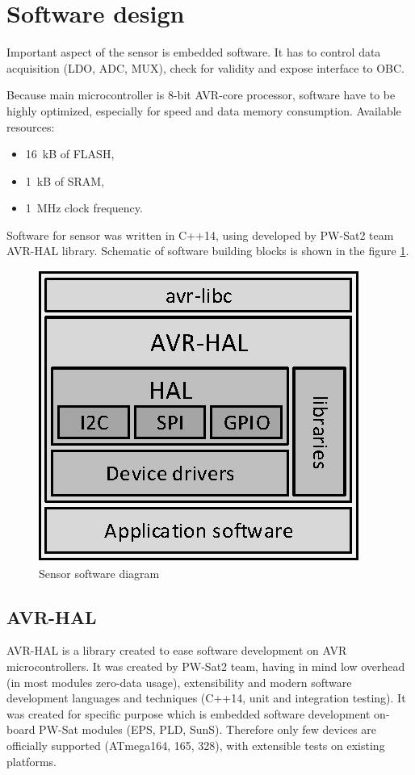 \section{Software design}
    Important aspect of the sensor is embedded software. It has to control data acquisition (LDO, ADC, MUX), check for validity and expose \iic interface to OBC.

    Because main microcontroller is 8-bit AVR-core processor, software have to be highly optimized, especially for speed and data memory consumption. Available resources:
    \begin{itemize}
        \item \SI{16}{\kilo B} of FLASH,
        \item \SI{1}{\kilo B} of SRAM,
        \item \SI{1}{\mega\hertz} clock frequency.
    \end{itemize}

    Software for sensor was written in C++14, using developed by PW-Sat2 team AVR-HAL library. Schematic of software building blocks is shown in the figure \ref{Sensor_software_diagram}.

    \begin{figure}[H]
        \centering
        \includegraphics[width=0.5\paperwidth]{img/06/software_diagram.eps}
        \caption{Sensor software diagram}
        \label{Sensor_software_diagram}
    \end{figure}

    \subsection{AVR-HAL}
    AVR-HAL is a library created to ease software development on AVR microcontrollers. It was created by PW-Sat2 team, having in mind low overhead (in most modules zero-data usage), extensibility and modern software development languages and techniques (C++14, unit and integration testing). It was created for specific purpose which is embedded software development on-board PW-Sat modules (EPS, PLD, SunS). Therefore only few devices are officially supported (ATmega164, 165, 328), with extensible tests on existing platforms.

